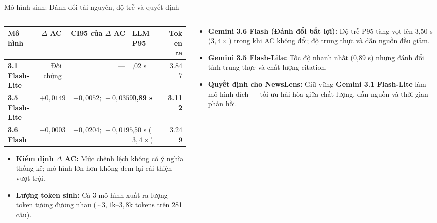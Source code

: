 \begin{frame}[t]{Mô hình sinh: Đánh đổi tài nguyên, độ trễ và quyết định}
\begin{columns}[T,onlytextwidth]
\begin{column}{.49\textwidth}
{\fontsize{13}{16}\selectfont
\setlength{\tabcolsep}{3.5pt}
\renewcommand{\arraystretch}{1.2}
\begin{tabularx}{\linewidth}{@{}lrr>{\centering\arraybackslash}Xr@{}}
\toprule
\rowcolor{paleblue}\textbf{Mô hình} & \textbf{$\Delta$ AC} & \textbf{CI95 của $\Delta$ AC} & \textbf{LLM P95} & \textbf{Token ra} \\\midrule
\textbf{3.1 Flash-Lite} & Đối chứng & --- & 1,02 s & 3.847 \\\midrule
\textbf{3.5 Flash-Lite} & $+0{,}0149$ & $[-0{,}0052;\,+0{,}0359]$ & \textbf{0,89 s} & \textbf{3.112} \\\midrule
\textbf{3.6 Flash} & $-0{,}0003$ & $[-0{,}0204;\,+0{,}0195]$ & 3,50 s ($3{,}4\times$) & 3.249 \\\bottomrule
\end{tabularx}\par}
\vspace{3mm}
{\fontsize{13}{17}\selectfont
\begin{itemize}
  \setlength{\itemsep}{4pt}
  \item \textbf{Kiểm định $\Delta$ AC:} Mức chênh lệch không có ý nghĩa thống kê; mô hình lớn hơn không đem lại cải thiện vượt trội.
  \item \textbf{Lượng token sinh:} Cả 3 mô hình xuất ra lượng token tương đương nhau ($\sim 3{,}1\text{k}$--$3{,}8\text{k}$ tokens trên 281 câu).
\end{itemize}\par}
\end{column}
\begin{column}{.48\textwidth}
{\fontsize{13}{17}\selectfont
\begin{itemize}
  \setlength{\itemsep}{5pt}
  \item \textbf{Gemini 3.6 Flash (Đánh đổi bất lợi):} Độ trễ P95 tăng vọt lên 3,50 s ($3{,}4\times$) trong khi AC không đổi; độ trung thực và dẫn nguồn đều giảm.
  \item \textbf{Gemini 3.5 Flash-Lite:} Tốc độ nhanh nhất (0,89 s) nhưng đánh đổi tính trung thực và chất lượng citation.
  \item \textbf{Quyết định cho NewsLens:} Giữ vững \textbf{Gemini 3.1 Flash-Lite} làm mô hình đích — tối ưu hài hòa giữa chất lượng, dẫn nguồn và thời gian phản hồi.
\end{itemize}\par}
\end{column}
\end{columns}
\vspace{2mm}
\end{frame}
